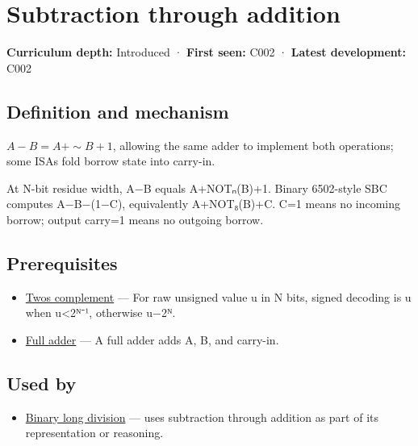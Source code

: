 \hypertarget{appendix-1c7df340573e}{}\label{referencestart:appendix-1c7df340573e}
\section{Subtraction through addition}\label{appendix-1c7df340573e-subtraction-through-addition}

\textbf{Curriculum depth:} Introduced · \textbf{First seen:} C002 · \textbf{Latest development:} C002

\begin{allmightroledefinition}

\subsection{Definition and mechanism}\label{appendix-1c7df340573e-definition-and-mechanism}

\(A-B=A+\sim B+1\), allowing the same adder to implement both operations; some ISAs fold borrow state into carry-in.

\end{allmightroledefinition}

At N-bit residue width, A−B equals A+NOTₙ(B)+1. Binary 6502-style SBC computes A−B−(1−C), equivalently A+NOT₈(B)+C. C=1 means no incoming borrow; output carry=1 means no outgoing borrow.

\subsection{Prerequisites}\label{appendix-1c7df340573e-prerequisites}

\begin{itemize}
\tightlist
\item
  \hyperref[appendix-4fbc03d20829]{Two\textquotesingle s complement} --- For raw unsigned value u in N bits, signed decoding is u when u\textless2ᴺ⁻¹, otherwise u−2ᴺ.
\item
  \hyperref[appendix-d1a5b1e520c2]{Full adder} --- A full adder adds A, B, and carry-in.
\end{itemize}

\subsection{Used by}\label{appendix-1c7df340573e-used-by}

\begin{itemize}
\tightlist
\item
  \hyperref[appendix-89985e6a2685]{Binary long division} --- uses subtraction through addition as part of its representation or reasoning.
\end{itemize}

